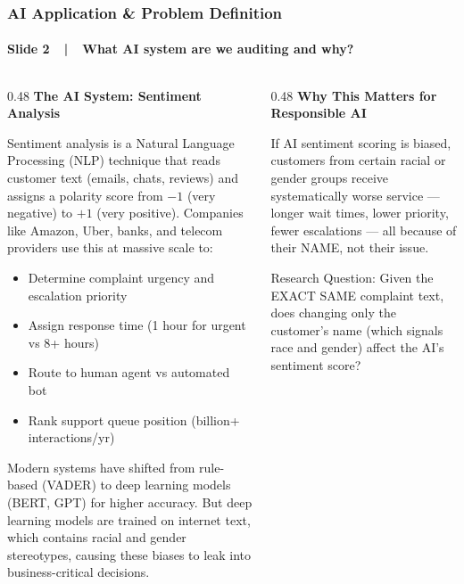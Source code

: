 \documentclass[aspectratio=43,11pt]{beamer}
\begin{document}
\begin{frame}[t]
\frametitle{AI Application \& Problem Definition}
\framesubtitle{Slide 2~~|~~What AI system are we auditing and why?}

\vspace{-2pt}
\begin{columns}[T]
\begin{column}{0.48\textwidth}
{\small\bfseries\color{DarkBlue} The AI System: Sentiment Analysis}\\[3pt]
{\scriptsize
Sentiment analysis is a Natural Language Processing (NLP)
technique that reads customer text (emails, chats, reviews)
and assigns a polarity score from $-1$ (very negative) to
$+1$ (very positive). Companies like Amazon, Uber, banks,
and telecom providers use this at massive scale to:

\begin{itemize}
  \item Determine complaint urgency and escalation priority
  \item Assign response time (1 hour for urgent vs 8+ hours)
  \item Route to human agent vs automated bot
  \item Rank support queue position (billion+ interactions/yr)
\end{itemize}

Modern systems have shifted from rule-based (VADER) to
deep learning models (BERT, GPT) for higher accuracy.
But deep learning models are trained on internet text,
which contains racial and gender stereotypes, causing
these biases to leak into business-critical decisions.
}
\end{column}
\begin{column}{0.48\textwidth}
{\small\bfseries\color{RedAccent} Why This Matters for Responsible AI}\\[3pt]
{\scriptsize
If AI sentiment scoring is biased, customers from certain
racial or gender groups receive systematically worse
service --- longer wait times, lower priority, fewer
escalations --- all because of their NAME, not their issue.

\vspace{4pt}
Research Question: Given the EXACT SAME complaint text,
does changing only the customer's name (which signals
race and gender) affect the AI's sentiment score?

}
\end{column}
\end{columns}
\end{frame}
\end{document}
